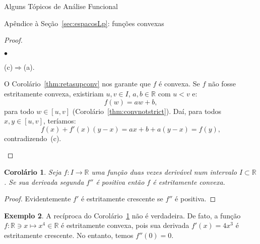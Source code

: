 \documentclass[oneside,final,11pt]{amsbook}
\newcommand{\R}{\mathds R}
\newcounter{contador}
\newenvironment{bulletindent}{\setcounter{contador}{0}
\begin{list} {$\bullet$}
{\usecounter{contador}
\setlength{\leftmargin}{10pt}
\setlength{\rightmargin}{10pt}
\setlength{\labelsep}{5pt}
\setlength{\itemsep}{10pt}
\setlength{\topsep}{10pt}}}
{\end{list}}
\theoremstyle{remark}\newtheorem{exercise}{Exercício}[chapter]
\theoremstyle{remark}\newtheorem{*exercise}[exercise]{\hbox to 0pt{\hskip 0pt minus 1fil*}Exercício}
\theoremstyle{definition}\newtheorem{exdefin}{Definição}[chapter]
\theoremstyle{plain}\newtheorem{teo}{Teorema}[section]
\theoremstyle{plain}\newtheorem{lem}[teo]{Lema}
\theoremstyle{plain}\newtheorem{prop}[teo]{Proposição}
\theoremstyle{plain}\newtheorem{cor}[teo]{Corolário}
\theoremstyle{definition}\newtheorem{defin}[teo]{Definição}
\theoremstyle{remark}\newtheorem{rem}[teo]{Observação}
\theoremstyle{definition}\newtheorem{notation}[teo]{Notação}
\theoremstyle{definition}\newtheorem{convention}[teo]{Convenção}
\theoremstyle{definition}\newtheorem{example}[teo]{Exemplo}
\numberwithin{section}{chapter}
\numberwithin{equation}{section}
\begin{document}
\begin{chapter}{Alguns Tópicos de Análise Funcional}
\begin{section}{Apêndice à Seção~\ref{sec:espacosLp}: funções convexas}
\begin{proof}
\begin{bulletindent}
\item (c)$\Rightarrow$(a).

O Corolário~\ref{thm:retasupconv} nos garante que $f$ é convexa. Se $f$ não fosse
estritamente convexa, existiriam $u,v\in I$, $a,b\in\R$ com $u<v$ e:
\[f(w)=aw+b,\]
para todo $w\in[u,v]$ (Corolário~\ref{thm:convnotstrict}). Daí, para todos $x,y\in[u,v]$,
teríamos:
\[f(x)+f'(x)(y-x)=ax+b+a(y-x)=f(y),\]
contradizendo~(c).\qedhere
\end{bulletindent}
\end{proof}

\begin{cor}\label{thm:secderpos}
Seja $f:I\to\R$ uma função duas vezes derivável num intervalo $I\subset\R$. Se sua
derivada segunda $f''$ é positiva então $f$ é estritamente convexa.
\end{cor}
\begin{proof}
Evidentemente $f'$ é estritamente crescente se $f''$ é positiva.
\end{proof}

\begin{example}
A recíproca do Corolário~\ref{thm:secderpos} não é verdadeira.
De fato, a função $f:\R\ni x\mapsto x^4\in\R$ é estritamente convexa, pois sua derivada
$f'(x)=4x^3$ é estritamente crescente. No entanto, temos $f''(0)=0$.
\end{example}


\end{section}
\end{chapter}
\end{document}
